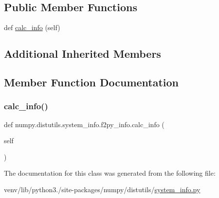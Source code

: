 \subsection*{Public Member Functions}
\begin{DoxyCompactItemize}
\item 
def \hyperlink{classnumpy_1_1distutils_1_1system__info_1_1f2py__info_a7349b46fa51d5a61b74fc5e9078f6d7e}{calc\+\_\+info} (self)
\end{DoxyCompactItemize}
\subsection*{Additional Inherited Members}


\subsection{Member Function Documentation}
\mbox{\label{classnumpy_1_1distutils_1_1system__info_1_1f2py__info_a7349b46fa51d5a61b74fc5e9078f6d7e}} 
\subsubsection{\texorpdfstring{calc\+\_\+info()}{calc\_info()}}
{\footnotesize\ttfamily def numpy.\+distutils.\+system\+\_\+info.\+f2py\+\_\+info.\+calc\+\_\+info (\begin{DoxyParamCaption}\item[{}]{self }\end{DoxyParamCaption})}



The documentation for this class was generated from the following file\+:\begin{DoxyCompactItemize}
\item 
venv/lib/python3./site-\/packages/numpy/distutils/\hyperlink{system__info_8py}{system\+\_\+info.\+py}\end{DoxyCompactItemize}
